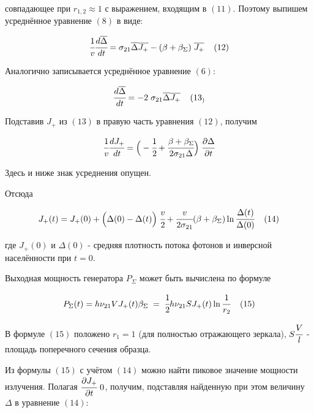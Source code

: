 \documentclass[a4paper,14pt,russian]{article}
\begin{document}
совпадающее при $r_{1, 2} \approx 1$ с выражением, входящим в $(11)$. Поэтому выпишем усреднённое уравнение $(8)$ в виде:

\begin{eqnarray}
\cfrac {1} {v} \cfrac {d \overline{\Delta}} {dt} = \sigma_{21} \overline{\Delta} \overline{J_+} - (\beta + \beta_{\Sigma}) \; \overline{J_+} \;\;\;\; (12)
\end{eqnarray}

Аналогично записывается усреднённое уравнение $(6)$:

\begin{eqnarray}
\cfrac {d \overline{\Delta}} {dt} = -2 \; \sigma_{21} \overline{\Delta} \overline{J_+} \;\;\;\; (13_)
\end{eqnarray}

Подставив $J_+$ из $(13)$ в правую часть уравнения $(12)$, получим

\begin{eqnarray}
\cfrac {1} {v} \cfrac {d J_+} {dt} = \Big( - \cfrac {1} {2} + \cfrac {\beta + \beta_{\Sigma}} {2 \sigma_{21} \Delta} \Big) \; \cfrac {\partial \Delta} {\partial t}
\end{eqnarray}

Здесь и ниже знак усреднения опущен.

Отсюда

\begin{eqnarray}
J_+(t) = J_+(0) + \Big( \Delta(0) - \Delta(t) \Big) \; \cfrac {v} {2} + \cfrac {v} {2 \sigma_{21}} (\beta + \beta_{\Sigma}) \ln \cfrac {\Delta(t)} {\Delta(0)} \;\;\;\; (14)
\end{eqnarray}

где $J_+(0)$ и $\Delta(0)$ - средняя плотность потока фотонов и инверсной населённости при $t = 0$.

Выходная мощность генератора $P_{\Sigma}$ может быть вычислена по формуле

\begin{eqnarray}
P_{\Sigma}(t) = h \nu_{21} V J_+(t) \beta_{\Sigma} \; = \; \cfrac {1} {2} h \nu_{21} S J_+(t) \ln \cfrac {1} {r_2} \;\;\;\; (15)
\end{eqnarray}

В формуле $(15)$ положено $r_1 = 1$ (для полностью отражающего зеркала), $S \cfrac {V} {l}$ - площадь поперечного сечения образца.

Из формулы $(15)$ с учётом $(14)$ можно найти пиковое значение мощности излучения. Полагая $\cfrac {\partial J_+} {\partial t} \ 0$, получим, подставляя найденную при этом величину $\Delta$ в уравнение $(14)$:
\end{document}
